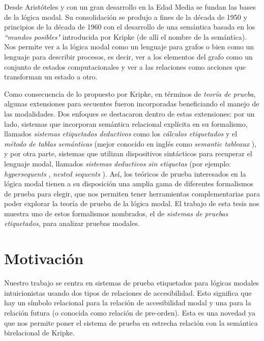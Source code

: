 Desde Aristóteles y con un gran desarrollo en la Edad Media se fundan las bases de la lógica modal. Su consolidación se produjo a fines de la década de 1950 y principios de la década de 1960 con el desarrollo de una semántica basada en los \emph{``mundos posibles"} introducida por Kripke \cite{kripke1959} (de allí el nombre de la semántica). Nos permite ver a la lógica modal como un lenguaje para grafos o bien como un lenguaje para describir procesos, es decir, ver a los elementos del grafo como un conjunto de estados computacionales y ver a las relaciones como acciones que transforman un estado a otro.

Como consecuencia de lo propuesto por Kripke, en términos de \emph{teoría de prueba}, algunas extensiones para secuentes fueron incorporadas beneficiando el manejo de las modalidades. Dos enfoques se destacaron dentro de estas extensiones: por un lado, sistemas que incorporan semántica relacional explícita en su formalismo, llamados \emph{sistemas etiquetados deductivos} como los \emph{cálculos etiquetados} \cite{negri2005} y el \emph{método de tablas semánticas} (mejor conocido en inglés como \emph{semantic tableaux} \cite{fitting1983}), y por otra parte, sistemas que utilizan dispositivos sintácticos para recuperar el lenguaje modal, llamados \emph{sistemas deductivos sin etiquetas} (por ejemplo: \emph{hypersequents} \cite{avron1996}, \emph{nested sequents} \cite{brunnler2009}). Así, los teóricos de prueba interesados en la lógica modal tienen a su disposición una amplia gama de diferentes formalismos de prueba para elegir, que nos permiten tener herramientas complementarias para poder explorar la teoría de prueba de la lógica modal. El trabajo de esta tesis nos muestra uno de estos formalismos nombrados, el de \emph{sistemas de pruebas etiquetados}, para analizar pruebas modales.

\section{Motivación}

Nuestro trabajo se centra en sistemas de prueba etiquetados para lógicas modales intuicionistas usando dos tipos de relaciones de accesibilidad. Esto significa que hay un símbolo relacional para la relación de accesibilidad modal y una para la relación futura (o conocida como relación de pre-orden). Esta es una novedad ya que nos permite poner el sistema de prueba en estrecha relación con la semántica birelacional de Kripke.

